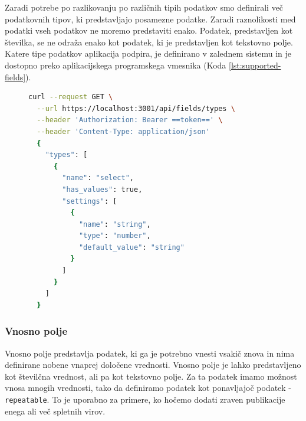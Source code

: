 Zaradi potrebe po razlikovanju po različnih tipih podatkov smo definirali več podatkovnih tipov, ki predstavljajo posamezne podatke. Zaradi raznolikosti med podatki vseh podatkov ne moremo predstaviti enako. Podatek, predstavljen kot številka, se ne odraža enako kot podatek, ki je predstavljen kot tekstovno polje. Katere tipe podatkov aplikacija podpira, je definirano v zalednem sistemu in je dostopno preko aplikacijskega programskega vmesnika (Koda \ref{lst:supported-fields}).

\begin{figure}[h]
\centering
\begin{lstlisting}[language=bash, style=mystyle,caption={Izsek aplikacijskega vmesnika za pridobitev vseh podprtih podatkovnih tipov v aplikaciji.},label=lst:supported-fields]
curl --request GET \
  --url https://localhost:3001/api/fields/types \
  --header 'Authorization: Bearer ==token==' \
  --header 'Content-Type: application/json'
  {
    "types": [
      {
        "name": "select",
        "has_values": true,
        "settings": [
          {
            "name": "string",
            "type": "number",
            "default_value": "string"
          }
        ]
      }
    ]
  }
\end{lstlisting}
\end{figure}



\subsubsection{Vnosno polje}
Vnosno polje predstavlja podatek, ki ga je potrebno vnesti vsakič znova in nima definirane nobene vnaprej določene vrednosti. Vnosno polje je lahko predstavljeno kot številčna vrednost, ali pa kot tekstovno polje.
Za ta podatek imamo možnost vnosa mnogih vrednosti, tako da definiramo podatek kot ponavljajoč podatek - \verb=repeatable=. To je uporabno za primere, ko hočemo dodati zraven publikacije enega ali več spletnih virov.

